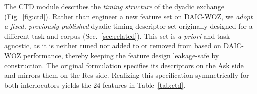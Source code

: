 \documentclass{article}
\begin{document}
The CTD module describes the \emph{timing structure} of the dyadic exchange (Fig.~\ref{fig:ctd}). 
Rather than engineer a new feature set on DAIC-WOZ, we \emph{adopt a fixed, previously published} dyadic timing descriptor set originally designed for a different task and corpus (Sec.~\ref{sec:related}). 
This set is \emph{a priori} and task-agnostic, as it is neither tuned nor added to or removed from based on DAIC-WOZ performance, thereby keeping the feature design leakage-safe by construction. 
The original formulation specifies its descriptors on the Ask side and mirrors them on the Res side. Realizing this specification symmetrically for both interlocutors yields the 24 features in Table~\ref{tab:ctd}. 
\end{document}
